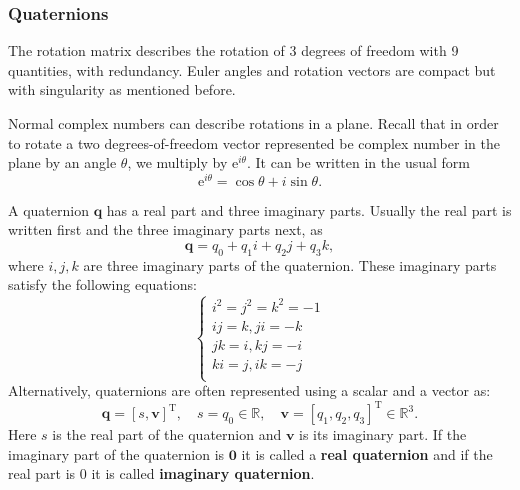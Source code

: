 \documentclass[journal]{IEEEtran}
\begin{document}
%
\newpage
\subsubsection{Quaternions}
The rotation matrix describes the rotation of 3 degrees of freedom with 9 quantities, with redundancy. Euler angles and rotation vectors are compact but with singularity as mentioned before.

Normal complex numbers can describe rotations in a plane. Recall that in order to rotate a two degrees-of-freedom vector represented be  complex number in the plane  by an angle $\theta$, we  multiply by $\mathrm{e}^{i\theta}$. It can be written in the usual form
\begin{equation}
    \mathrm{e}^{i \theta}=\cos \theta  + i \sin \theta.
\end{equation}

A quaternion $\mathbf{q}$ has a real part and three imaginary parts. Usually the real part is written first and the three imaginary parts next, as
\begin{equation}
    \mathbf{q}= q_0 + q_1 i + q_2 j + q_3 k,
\end{equation}
where $i, j, k$ are three imaginary parts of the quaternion. These imaginary parts satisfy the following equations:
\begin{equation}
    \left\{ \begin{array}{l}
         {i^2} = {j^2} = {k^2} = -1   \\
         ij = k, ji = -k \\
         jk = i, kj = -i \\
         ki = j, ik = -j \\
    \end{array}    \right.
\end{equation}
Alternatively, quaternions are often represented using a scalar and a vector as:
\[
\mathbf{q} =  \left[s, \mathbf{v} \right]^\mathrm{T}, \quad s =q_0 \in \mathbb{R}, \quad \mathbf{v} = [q_1, q_2, q_3]^\mathrm{T} \in \mathbb{R}^3.
\]
Here $s$ is the real part of the quaternion and $\mathbf{v}$ is its imaginary part. If the imaginary part of the quaternion is $\mathbf{0}$ it is called a \textbf{real quaternion} and if the real part is $0$ it is called \textbf{imaginary quaternion}.\par
$ $\hfill
\end{document}
